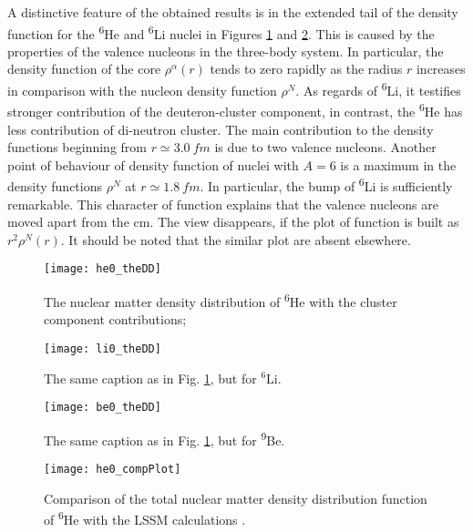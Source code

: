 \documentclass[
12pt, %
oneside, %
english, %
onehalfspacing, %
onehalfspacing, %
headsepline, %
]{MastersDoctoralThesis} %
\newcommand{\he}{\textsuperscript{6}He\xspace}
\newcommand{\li}{\textsuperscript{6}Li\xspace}
\newcommand{\be}{\textsuperscript{9}Be\xspace}
\begin{document}
A distinctive feature of the obtained results is in the extended tail of the density function for the \he and \li nuclei in Figures \ref{he0_theDD} and \ref{li0_theDD}. 
This is caused by the properties of the valence nucleons in the three-body system. 
In particular, the density function of the core $\rho^\alpha(r)$ tends to zero rapidly as the radius $r$ increases in comparison with the nucleon density function $\rho^{N}$. 
As regards of \li, it testifies stronger contribution of the deuteron-cluster component, in contrast, the \he has less contribution of di-neutron cluster.
The main contribution to the density functions beginning from $r \simeq 3.0~fm$ is due to two valence nucleons.
Another point of behaviour of density function of nuclei with $A=6$ is a maximum in the density functions $\rho^N$ at $r \simeq 1.8~ fm $. In particular, the bump of \li is sufficiently remarkable. This character of function explains that the valence nucleons are moved apart from the cm.  The view disappears, if the plot of function is built as $r^2 \rho^N(r)$. It should be noted that the similar plot are absent elsewhere.

\begin{figure}
\centering
\texttt{[image: he0\_theDD]}
\decoRule
\caption{  \footnotesize  The nuclear matter density distribution of \he with the cluster component contributions;}
\label{he0_theDD}
\end{figure}
\begin{figure}
\centering
\texttt{[image: li0\_theDD]}
\decoRule
\caption{  \footnotesize  The same caption as in Fig. \ref{he0_theDD}, but for $^6$Li. }
\label{li0_theDD}
\end{figure}
\begin{figure}
\centering
\texttt{[image: be0\_theDD]}
\decoRule
\caption{  \footnotesize  The same caption as in Fig. \ref{he0_theDD}, but for \be.}
\label{be0_theDD}
\end{figure}
\begin{figure}
\centering
\texttt{[image: he0\_compPlot]}
\decoRule
\caption{  \footnotesize  Comparison of the total nuclear matter density distribution function of \he with the LSSM calculations \cite{antonov2005charge}. }
\label{he0_compPlot}
\end{figure}
\end{document}
